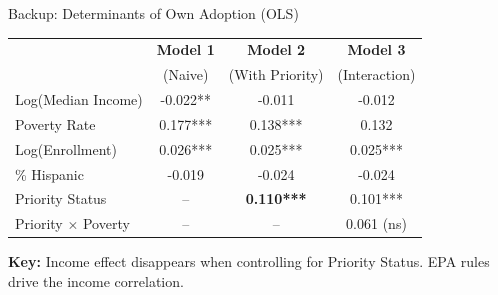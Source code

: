 \documentclass[10pt]{beamer}
\begin{document}
\begin{frame}[label=backup_own_adoption]{Backup: Determinants of Own Adoption (OLS)}
  \centering
  \scriptsize
  \begin{tabular}{l c c c}
    \toprule
    & \textbf{Model 1} & \textbf{Model 2} & \textbf{Model 3} \\
    & (Naive) & (With Priority) & (Interaction) \\
    \midrule
    Log(Median Income) & -0.022** & -0.011 & -0.012 \\
    Poverty Rate & 0.177*** & 0.138*** & 0.132 \\
    Log(Enrollment) & 0.026*** & 0.025*** & 0.025*** \\
    \% Hispanic & -0.019 & -0.024 & -0.024 \\
    Priority Status & -- & \textbf{0.110***} & 0.101*** \\
    Priority $\times$ Poverty & -- & -- & 0.061 (ns) \\
    \bottomrule
  \end{tabular}
  
  \vspace{1em}
  \textbf{Key:} Income effect disappears when controlling for Priority Status. EPA rules drive the income correlation.
  \vspace{1em}
  
  \hyperlink{core_question}{}
\end{frame}
\end{document}
